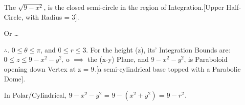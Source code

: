 \documentclass[a4paper, 10pt, onepage]{elegantbook}
\begin{document}
The $\sqrt{9 - x^2}$, is the closed semi-circle in the region of Integration.[Upper Half- Circle, with Radius = 3].


Or \ldots



$\therefore$. $0 \leq \theta \leq \pi$, and $0 \leq r \leq 3$.
For the height (z), its' Integration Bounds are: $0 \leq z \leq 9 - x^2 - y^2$, o $\implies$ the (x-y) Plane,
and $9 -x^2 - y^2$, is Paraboloid opening down Vertex at z = 9.[a semi-cylindrical base topped with a Parabolic Dome].

In Polar/Cylindrical, $9 - x^2 - y^2$ = $9 - (x^2 + y^2)$ = $9 - r^2$.
\end{document}
